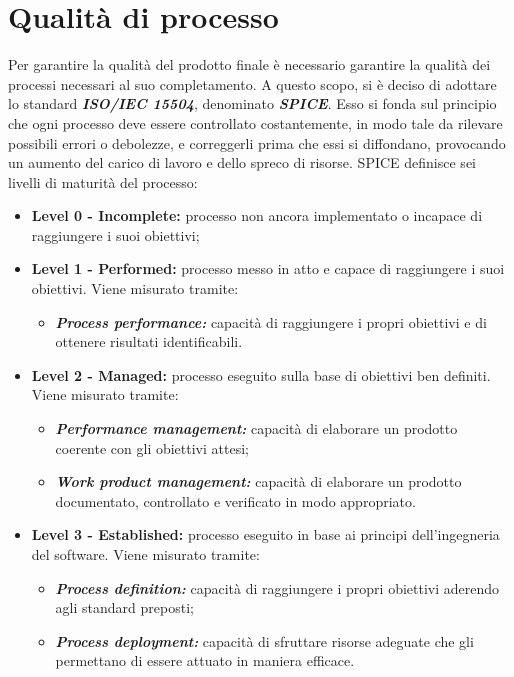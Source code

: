 \newpage
\section{Qualità di processo}

	Per garantire la qualità del prodotto finale è necessario garantire la qualità dei processi necessari al suo completamento. A questo scopo, si è deciso di adottare lo standard \textbf{\textit{ISO/IEC 15504}}, denominato \textbf{\textit{SPICE}}.
	Esso si fonda sul principio che ogni processo deve essere controllato costantemente, in modo tale da rilevare possibili errori o debolezze, e correggerli prima che essi si diffondano, provocando un aumento del carico di lavoro e dello spreco di risorse.
	SPICE definisce sei livelli di maturità del processo:
	
	\begin{itemize}
		\item \textbf{Level 0 - Incomplete:} processo non ancora implementato o incapace di raggiungere i suoi obiettivi;
		\item \textbf{Level 1 - Performed:} processo messo in atto e capace di raggiungere i suoi obiettivi. Viene misurato tramite:
		\begin{itemize}
			\item \textbf{\textit{Process performance:}} capacità di raggiungere i propri obiettivi e di ottenere risultati identificabili.
		\end{itemize}
		\item \textbf{Level 2 - Managed:} processo eseguito sulla base di obiettivi ben definiti. Viene misurato tramite:
		\begin{itemize}
			\item \textbf{\textit{Performance management:}} capacità di elaborare un prodotto coerente con gli obiettivi attesi;
			\item \textbf{\textit{Work product management:}} capacità di elaborare un prodotto documentato, controllato e verificato in modo appropriato.
		\end{itemize}
		\item \textbf{Level 3 - Established:} processo eseguito in base ai principi dell’ingegneria del software. Viene misurato tramite:
		\begin{itemize}
			\item \textbf{\textit{Process definition:}} capacità di raggiungere i propri obiettivi aderendo agli standard preposti;
			\item \textbf{\textit{Process deployment:}} capacità di sfruttare risorse adeguate che gli permettano di essere attuato in maniera efficace.

\end{itemize}
\end{itemize}
